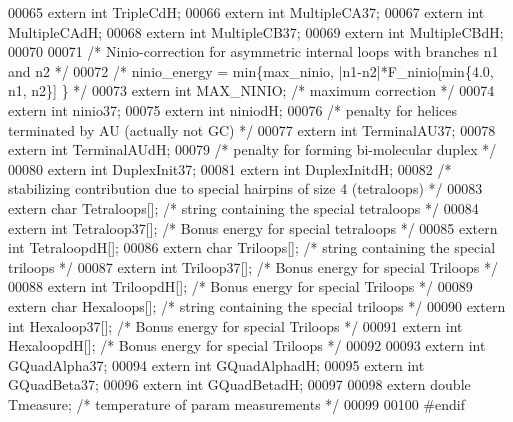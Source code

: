 \begin{DoxyCode}
00065 \textcolor{keyword}{extern} \textcolor{keywordtype}{int} TripleCdH;
00066 \textcolor{keyword}{extern} \textcolor{keywordtype}{int} MultipleCA37;
00067 \textcolor{keyword}{extern} \textcolor{keywordtype}{int} MultipleCAdH;
00068 \textcolor{keyword}{extern} \textcolor{keywordtype}{int} MultipleCB37;
00069 \textcolor{keyword}{extern} \textcolor{keywordtype}{int} MultipleCBdH;
00070 
00071 \textcolor{comment}{/* Ninio-correction for asymmetric internal loops with branches n1 and n2 */}
00072 \textcolor{comment}{/*    ninio\_energy = min\{max\_ninio, |n1-n2|*F\_ninio[min\{4.0, n1, n2\}] \} */}
00073 \textcolor{keyword}{extern} \textcolor{keywordtype}{int}  MAX\_NINIO;                   \textcolor{comment}{/* maximum correction */}
00074 \textcolor{keyword}{extern} \textcolor{keywordtype}{int} ninio37;
00075 \textcolor{keyword}{extern} \textcolor{keywordtype}{int} niniodH;
00076 \textcolor{comment}{/* penalty for helices terminated by AU (actually not GC) */}
00077 \textcolor{keyword}{extern} \textcolor{keywordtype}{int} TerminalAU37;
00078 \textcolor{keyword}{extern} \textcolor{keywordtype}{int} TerminalAUdH;
00079 \textcolor{comment}{/* penalty for forming bi-molecular duplex */}
00080 \textcolor{keyword}{extern} \textcolor{keywordtype}{int} DuplexInit37;
00081 \textcolor{keyword}{extern} \textcolor{keywordtype}{int} DuplexInitdH;
00082 \textcolor{comment}{/* stabilizing contribution due to special hairpins of size 4 (tetraloops) */}
00083 \textcolor{keyword}{extern} \textcolor{keywordtype}{char} Tetraloops[];  \textcolor{comment}{/* string containing the special tetraloops */}
00084 \textcolor{keyword}{extern} \textcolor{keywordtype}{int}  Tetraloop37[];  \textcolor{comment}{/* Bonus energy for special tetraloops */}
00085 \textcolor{keyword}{extern} \textcolor{keywordtype}{int}  TetraloopdH[];
00086 \textcolor{keyword}{extern} \textcolor{keywordtype}{char} Triloops[];    \textcolor{comment}{/* string containing the special triloops */}
00087 \textcolor{keyword}{extern} \textcolor{keywordtype}{int}  Triloop37[]; \textcolor{comment}{/* Bonus energy for special Triloops */}
00088 \textcolor{keyword}{extern} \textcolor{keywordtype}{int}  TriloopdH[]; \textcolor{comment}{/* Bonus energy for special Triloops */}
00089 \textcolor{keyword}{extern} \textcolor{keywordtype}{char} Hexaloops[];    \textcolor{comment}{/* string containing the special triloops */}
00090 \textcolor{keyword}{extern} \textcolor{keywordtype}{int}  Hexaloop37[]; \textcolor{comment}{/* Bonus energy for special Triloops */}
00091 \textcolor{keyword}{extern} \textcolor{keywordtype}{int}  HexaloopdH[]; \textcolor{comment}{/* Bonus energy for special Triloops */}
00092 
00093 \textcolor{keyword}{extern} \textcolor{keywordtype}{int} GQuadAlpha37;
00094 \textcolor{keyword}{extern} \textcolor{keywordtype}{int} GQuadAlphadH;
00095 \textcolor{keyword}{extern} \textcolor{keywordtype}{int} GQuadBeta37;
00096 \textcolor{keyword}{extern} \textcolor{keywordtype}{int} GQuadBetadH;
00097 
00098 \textcolor{keyword}{extern} \textcolor{keywordtype}{double} Tmeasure;       \textcolor{comment}{/* temperature of param measurements */}
00099 
00100 \textcolor{preprocessor}{#endif}
\end{DoxyCode}
